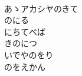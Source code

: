 \documentclass[10pt,b5j]{tarticle} %
\begin{document}
\begin{enumerate}
\begin{minipage}[c]{\blocksize}
    \end{minipage}
    \begin{minipage}[c]{\blocksize}
        
        \vspace{\linespace}
        \item~\\
        あゝアカシヤのきて\\
        のにる\\
        にちてべば\\
        きのにつ\\
        いでやのをり\\
        のをえかん
    
    \end{minipage}
\end{enumerate} %
\end{document}
